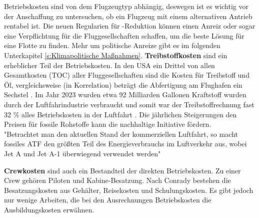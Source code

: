 Betriebskosten sind von dem Flugzeugtyp abhängig, deswegen ist es wichtig vor der Anschaffung zu untersuchen, 
ob ein Flugzeug mit einem alternativen Antrieb rentabel ist. Die neuen Regularien für -Reduktion können einen Anreiz oder sogar 
eine Verpflichtung für die Fluggesellschaften schaffen, um die beste Lösung für eine Flotte zu finden. 
Mehr um politische Anreize gibt es im folgenden Unterkapitel \ref{s:Klimapolitische Maßnahmen}.
%
\textbf{Treibstoffkosten} sind ein erheblicher Teil der Betriebskosten. In den USA ein Drittel von allen Gesamtkosten (TOC) aller 
Fluggesellschaften sind die Kosten für Treibstoff und Öl, vergleichsweise (in Korrelation) beträgt die Abfertigung am Flughafen ein Sechstel 
\cite{conrady2019luftverkehr}. 
Im Jahr 2023 wurden etwa 92 Milliarden Gallonen Kraftstoff wurden durch der Luftfahrindustrie verbraucht und somit
war der Treibstoffrechnung fast 32 \% alles Betriebskosten in der Luftfahrt \cite{iata_industry_statistics_2024}.
Die jährlichen Steigerungen den Preisen für fossile Rohstoffe kann die nachhaltige Initiative fördern. \\

"Betrachtet man den aktuellen Stand der kommerziellen Luftfahrt, so macht fossiles ATF den 
größten Teil des Energieverbrauchs im Luftverkehr aus, wobei Jet A und Jet A-1 überwiegend verwendet werden" %


\textbf{Crewkosten} sind auch ein Bestandteil der direkten Betriebskosten. Zu einer Crew gehören Piloten und Kabine-Besatzung.
Nach Conrady \cite{conrady2019luftverkehr} bestehen die Besatzungskosten aus Gehälter, Reisekosten und Schulungskosten.
Es gibt jedoch nur wenige Arbeiten, die bei den Ausrechnungen Betriebskosten die Ausbildungskosten erwähnen. 

